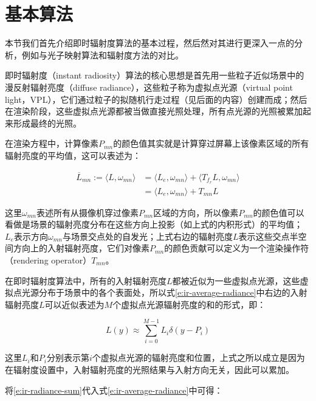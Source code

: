 \section{基本算法}
本节我们首先介绍即时辐射度算法的基本过程，然后然对其进行更深入一点的分析，例如与光子映射算法和辐射度方法的对比。

即时辐射度（instant radiosity）算法\cite{a:InstantRadiosity}的核心思想是首先用一些粒子近似场景中的漫反射辐射亮度（diffuse radiance），这些粒子称为虚拟点光源（virtual point light，VPL），它们通过粒子的拟随机行走过程（见后面的内容）创建而成；然后在渲染阶段，这些虚拟点光源都被当做直接光照处理，所有点光源的光照被累加起来形成最终的光照。

在渲染方程中，计算像素$P_{mn}$的颜色值其实就是计算穿过屏幕上该像素区域的所有辐射亮度的平均值，这可以表述为：

\begin{equation}\label{e:ir-average-radiance}
\begin{aligned}
	\overline{L}_{mn}:=\langle L,\omega_{mn}\rangle &=\langle L_e,\omega_{mn}\rangle +\langle T_{f_r}L,\omega_{mn}\rangle \\
	&=\langle L_e,\omega_{mn}\rangle+T_{mn}L
\end{aligned}
\end{equation}

\noindent 这里$\omega_{mn}$表述所有从摄像机穿过像素$P_{mn}$区域的方向，所以像素$P_{mn}$的颜色值可以看做是场景的辐射亮度分布在这些方向上投影（如上式的内积形式）的平均值；$L_e$表示方向$\omega_{mn}$与场景交点处的自发光；上式右边的辐射亮度$L$表示这些交点半空间方向上的入射辐射亮度，它们对像素$P_{mn}$的颜色贡献可以定义为一个渲染操作符（rendering operator）$T_{mn}$。

在即时辐射度算法中，所有的入射辐射亮度$L$都被近似为一些虚拟点光源，这些虚拟点光源分布于场景中的各个表面处，所以式\ref{e:ir-average-radiance}中右边的入射辐射亮度$L$可以近似表述为$M$个虚拟点光源辐射亮度的和的形式，即：

\begin{equation}\label{e:ir-radiance-sum}
	L(y)\approx\sum^{M-1}_{i=0}L_i\delta(y-P_i)
\end{equation}

\noindent 这里$L_i$和$P_i$分别表示第$i$个虚拟点光源的辐射亮度和位置，上式之所以成立是因为在辐射度设置中，入射辐射亮度的光照结果与入射方向无关，因此可以累加。

将\ref{e:ir-radiance-sum}代入式\ref{e:ir-average-radiance}中可得：

